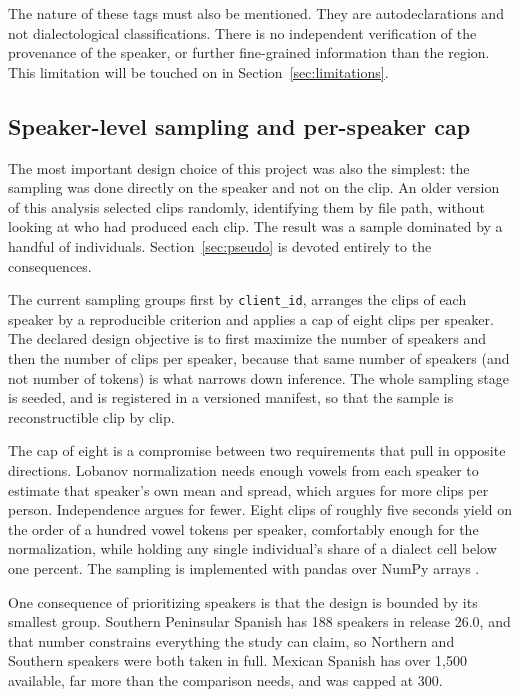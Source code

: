 \documentclass[11pt]{article}
\begin{document}
The nature of these tags must also be mentioned. They are autodeclarations and
not dialectological classifications. There is no independent verification of the
provenance of the speaker, or further fine-grained information than the region.
This limitation will be touched on in Section~\ref{sec:limitations}.

\subsection{Speaker-level sampling and per-speaker cap}

The most important design choice of this project was also the simplest: the
sampling was done directly on the speaker and not on the clip. An older version
of this analysis selected clips randomly, identifying them by file path, without
looking at who had produced each clip. The result was a sample dominated by a
handful of individuals. Section~\ref{sec:pseudo} is devoted entirely to the
consequences.

The current sampling groups first by \texttt{client\_id}, arranges the clips of
each speaker by a reproducible criterion and applies a cap of eight clips per
speaker. The declared design objective is to first maximize the number of
speakers and then the number of clips per speaker, because that same number of
speakers (and not number of tokens) is what narrows down inference. The whole
sampling stage is seeded, and is registered in a versioned manifest, so that the
sample is reconstructible clip by clip.

The cap of eight is a compromise between two requirements that pull in opposite
directions. Lobanov normalization needs enough vowels from each speaker to
estimate that speaker's own mean and spread, which argues for more clips per
person. Independence argues for fewer. Eight clips of roughly five seconds yield
on the order of a hundred vowel tokens per speaker, comfortably enough for the
normalization, while holding any single individual's share of a dialect cell
below one percent. The sampling is implemented with pandas \citep{mckinney2010}
over NumPy arrays \citep{harris2020}.

One consequence of prioritizing speakers is that the design is bounded by its
smallest group. Southern Peninsular Spanish has 188 speakers in release 26.0, and
that number constrains everything the study can claim, so Northern and Southern
speakers were both taken in full. Mexican Spanish has over 1,500 available, far
more than the comparison needs, and was capped at 300.
\end{document}
